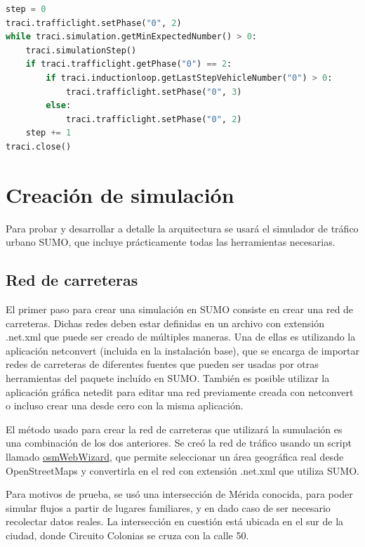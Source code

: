\begin{lstlisting}[language=Python]
step = 0
traci.trafficlight.setPhase("0", 2)
while traci.simulation.getMinExpectedNumber() > 0:
    traci.simulationStep()
    if traci.trafficlight.getPhase("0") == 2:
        if traci.inductionloop.getLastStepVehicleNumber("0") > 0:
            traci.trafficlight.setPhase("0", 3)
        else:
            traci.trafficlight.setPhase("0", 2)
    step += 1
traci.close()
\end{lstlisting}

\hypertarget{creaciuxf3n-de-simulaciuxf3n}{%
\section{Creación de simulación}\label{creaciuxf3n-de-simulaciuxf3n}}

Para probar y desarrollar a detalle la arquitectura se usará el
simulador de tráfico urbano SUMO, que incluye prácticamente todas las
herramientas necesarias.

\hypertarget{red-de-carreteras}{%
\subsection{Red de carreteras}\label{red-de-carreteras}}

El primer paso para crear una simulación en SUMO consiste en crear una
red de carreteras. Dichas redes deben estar definidas en un archivo con
extensión .net.xml que puede ser creado de múltiples maneras. Una de
ellas es utilizando la aplicación netconvert (incluida en la instalación
base), que se encarga de importar redes de carreteras de diferentes
fuentes que pueden ser usadas por otras herramientas del paquete
incluído en SUMO. También es posible utilizar la aplicación gráfica
netedit para editar una red previamente creada con netconvert o incluso
crear una desde cero con la misma aplicación.

El método usado para crear la red de carreteras que utilizará la
sumulación es una combinación de los dos anteriores. Se creó la red de
tráfico usando un script llamado
\href{https://sumo.dlr.de/docs/Tutorials/OSMWebWizard.html}{osmWebWizard},
que permite seleccionar un área geográfica real desde OpenStreetMaps y
convertirla en el red con extensión .net.xml que utiliza SUMO.

Para motivos de prueba, se usó una intersección de Mérida conocida, para
poder simular flujos a partir de lugares familiares, y en dado caso de
ser necesario recolectar datos reales. La intersección en cuestión está
ubicada en el sur de la ciudad, donde Circuito Colonias se cruza con la
calle 50.

